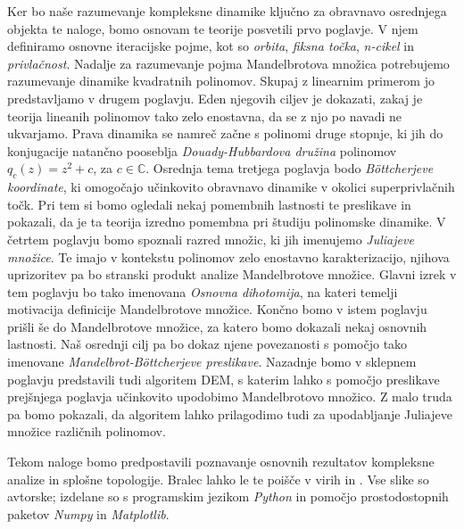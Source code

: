\documentclass[12pt,a4paper]{amsart}
\theoremstyle{definition} %
\theoremstyle{plain} %
\newcommand{\CC}{\mathbb C}
\begin{document}
Ker bo naše razumevanje kompleksne dinamike ključno za obravnavo osrednjega objekta te naloge, bomo osnovam te teorije posvetili prvo poglavje. V njem definiramo osnovne iteracijske pojme, kot so {\em orbita}, {\em fiksna točka}, {\em n-cikel} in {\em privlačnost}. Nadalje za razumevanje pojma Mandelbrotova množica potrebujemo razumevanje dinamike kvadratnih polinomov. Skupaj z linearnim primerom jo predstavljamo v drugem poglavju. Eden njegovih ciljev je dokazati, zakaj je teorija lineanih polinomov tako zelo enostavna, da se z njo po navadi ne ukvarjamo. Prava dinamika se namreč začne s polinomi druge stopnje, ki jih do konjugacije natančno pooseblja {\em Douady-Hubbardova družina} polinomov $q_c(z) = z^2 + c$, za $c\in\CC$. Osrednja tema tretjega poglavja bodo {\em B{\"o}ttcherjeve koordinate}, ki omogočajo učinkovito obravnavo dinamike v okolici superprivlačnih točk. Pri tem si bomo ogledali nekaj pomembnih lastnosti te preslikave in pokazali, da je ta teorija izredno pomembna pri študiju polinomske dinamike. V četrtem poglavju bomo spoznali razred množic, ki jih imenujemo {\em Juliajeve množice}. Te imajo v kontekstu polinomov zelo enostavno karakterizacijo, njihova uprizoritev pa bo stranski produkt analize Mandelbrotove množice. Glavni izrek v tem poglavju bo tako imenovana {\em Osnovna dihotomija}, na kateri temelji motivacija definicije Mandelbrotove množice. Končno bomo v istem poglavju prišli še do Mandelbrotove množice, za katero bomo dokazali nekaj osnovnih lastnosti. Naš osrednji cilj pa bo dokaz njene povezanosti s pomočjo tako imenovane {\em Mandelbrot-B{\"o}ttcherjeve preslikave}. Nazadnje bomo v sklepnem poglavju predstavili tudi algoritem DEM, s katerim lahko s pomočjo preslikave prejšnjega poglavja učinkovito upodobimo Mandelbrotovo množico. Z malo truda pa bomo pokazali, da algoritem lahko prilagodimo tudi za upodabljanje Juliajeve množice različnih polinomov.

Tekom naloge bomo predpostavili poznavanje osnovnih rezultatov kompleksne analize in splošne topologije.
Bralec lahko le te poišče v virih \cite{conway} in \cite{kelley}.
Vse slike so avtorske; izdelane so s programskim jezikom {\em Python} in 
pomočjo prostodostopnih paketov {\em Numpy} in {\em Matplotlib}.

\clearpage
\end{document}
